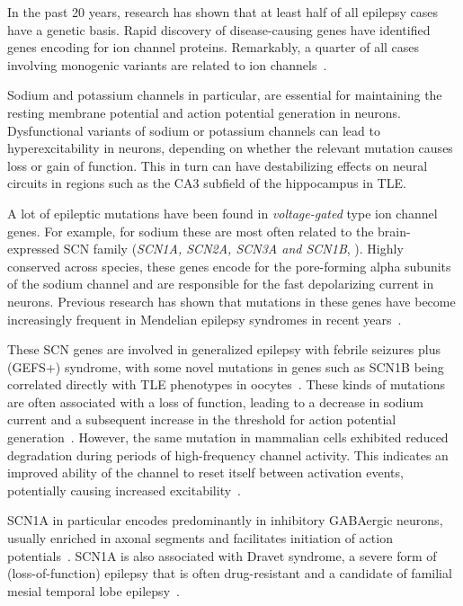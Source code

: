 In the past 20 years, research has shown that at least half of all epilepsy cases have a genetic basis.
Rapid discovery of disease-causing genes have identified genes encoding for ion channel proteins.
Remarkably, a quarter of all cases involving monogenic variants are related to ion channels~\parencite{strianoGeneticTestingPrecision2020,oyrerIonChannelsGenetic2018}.

Sodium and potassium channels in particular, are essential for maintaining the resting
membrane potential and action potential generation in neurons.
Dysfunctional variants of sodium or potassium channels can lead to hyperexcitability in neurons, depending on whether the relevant mutation causes loss or gain of function.
This in turn can have destabilizing effects on neural circuits in regions such as the CA3 subfield of the hippocampus in TLE\@.

A lot of epileptic mutations have been found in \textit{voltage-gated} type ion channel genes.
For example, for sodium these are most often related to the brain-expressed
SCN family (\textit{SCN1A, SCN2A, SCN3A and SCN1B}, \textcite{brunklausSodiumChannelEpilepsies2020}).
Highly conserved across species, these genes encode for the pore-forming alpha subunits of the sodium channel
and are responsible for the fast depolarizing current in neurons. Previous research has shown that mutations in these genes have become
increasingly frequent in Mendelian epilepsy syndromes in recent years~\parencite{brunklausSodiumChannelEpilepsies2020}.

These SCN genes are involved in generalized epilepsy with febrile seizures plus (GEFS+) syndrome, with some novel mutations
in genes such as SCN1B being correlated directly with TLE phenotypes in oocytes~\parencite{schefferTemporalLobeEpilepsy2006}.
These kinds of mutations are often associated with a loss of function, leading to a decrease in sodium current and a subsequent increase
in the threshold for action potential generation~\parencite{wallaceFebrileSeizuresGeneralized1998}.
However, the same mutation in mammalian cells exhibited reduced degradation during periods of high-frequency
channel activity. This indicates an improved ability of the channel to reset itself between activation events, potentially causing increased excitability~\parencite{meadowsFunctionalBiochemicalAnalysis2002}.

SCN1A in particular encodes predominantly in inhibitory GABAergic neurons, usually enriched in axonal segments and facilitates initiation of action potentials~\parencite{yuReducedSodiumCurrent2006}.
SCN1A is also associated with Dravet syndrome, a severe form of (loss-of-function) epilepsy that is often drug-resistant and a
candidate of familial mesial temporal lobe epilepsy~\parencite{hwangGeneticsTemporalLobe2012a}.


